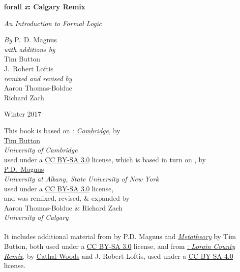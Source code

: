 

\pagestyle{empty}

\vspace*{100pt}

\begin{raggedleft}
\fontsize{24pt}{24pt}\selectfont
  \textbf{forall \textit{x}: Calgary Remix}

\medskip\fontsize{18pt}{20pt}\selectfont

\textit{An Introduction to Formal Logic}

\vspace*{50pt}
\fontsize{16pt}{18pt}\selectfont \textit{By } P.~D. Magnus\\
\textit{with additions by}\\
Tim Button\\ J.~Robert Loftis\\
\textit{remixed and revised by}\\
Aaron Thomas-Bolduc\\ Richard Zach

\vfill
Winter 2017\par
\end{raggedleft}


\newpage


\noindent \small This book is based on \href{http://people.ds.cam.ac.uk/tecb2/forallx.shtml}{\forallx:\emph{ Cambridge}}, by\\[2ex]
\href{http://people.ds.cam.ac.uk/tecb2/index.shtml}{Tim Button}\\
\emph{University of Cambridge}\\[2ex]
used under a \href{https://creativecommons.org/licenses/by-sa/3.0/}{CC BY-SA 3.0} license, which is based in turn on \href{https://www.fecundity.com/logic/}{\forallx}, by\\[2ex]
\href{https://www.fecundity.com/job/}{P.D.\ Magnus}\\
\emph{University at Albany, State University of New York}\\[2ex]
used under a \href{https://creativecommons.org/licenses/by-sa/3.0/}{CC BY-SA 3.0} license,
\\
and was remixed, revised, \& expanded by\\[2ex] {Aaron Thomas-Bolduc \& Richard Zach}\\
\emph{University of Calgary}
\\
\\
It includes additional material from \forallx{} by P.D. Magnus
and \href{http://people.ds.cam.ac.uk/tecb2/metatheory.shtml}{\emph{Metatheory}} by Tim Button, both used under
a \href{https://creativecommons.org/licenses/by-sa/3.0/}{CC BY-SA 3.0}
license, and from \href{https://github.com/rob-helpy-chalk/openintroduction}{\forallx: \emph{Lorain County Remix}}, by \href{https://sites.google.com/site/cathalwoods/}{Cathal
Woods} and J. Robert Loftis, used under
a \href{https://creativecommons.org/licenses/by-sa/4.0/}{CC BY-SA 4.0}
license.

